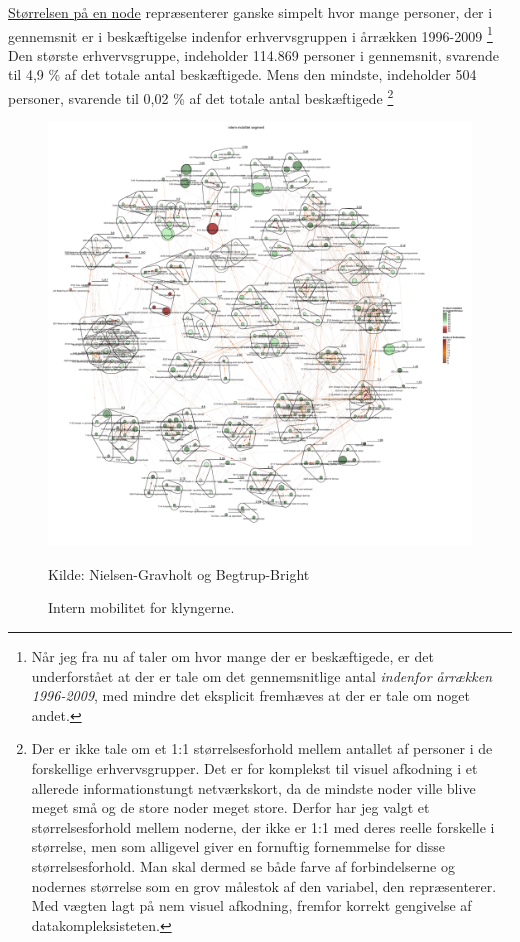 \underline{Størrelsen på en node} repræsenterer ganske simpelt hvor mange personer, der i gennemsnit er i beskæftigelse indenfor erhvervsgruppen i årrækken 1996-2009%
%
\footnote{Når jeg fra nu af taler om hvor mange der er beskæftigede, er det underforstået at der er tale om det gennemsnitlige antal \emph{indenfor årrækken 1996-2009}, med mindre det eksplicit fremhæves at der er tale om noget andet.}%
%
Den største erhvervsgruppe,  indeholder 114.869 personer i gennemsnit, svarende til 4,9 \% af det totale antal beskæftigede. Mens den mindste,  indeholder 504 personer, svarende til 0,02 \% af det totale antal beskæftigede
%
\footnote{Der er ikke tale om et 1:1 størrelsesforhold mellem antallet af personer i de forskellige erhvervsgrupper. Det er for komplekst til visuel afkodning i et allerede informationstungt netværkskort, da de mindste noder ville blive meget små og de store noder meget store. Derfor har jeg valgt et størrelsesforhold mellem noderne, der ikke er 1:1 med deres reelle forskelle i størrelse, men som alligevel giver en fornuftig fornemmelse for disse størrelsesforhold. Man skal dermed se både farve af forbindelserne og nodernes størrelse som en grov målestok af den variabel, den repræsenterer. Med vægten lagt på nem visuel afkodning, fremfor korrekt gengivelse af datakompleksisteten.}%

\begin{figure}[H]
\begin{center}
	\caption{Intern mobilitet for klyngerne.}
	\label{fig_analyse_deskriptivt_kort_intern_mob_seg}
	\includegraphics[width=1.0\textwidth]{fig/netvaerkskort/kort_intern_mob_seg.pdf}
	\centerline{ \tiny{Kilde: Nielsen-Gravholt og Begtrup-Bright}}
\end{center}
\end{figure}
\restoregeometry

